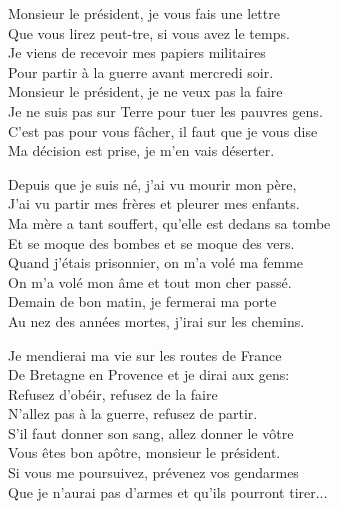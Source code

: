 
\ve{}
Monsieur le président, je vous fais une lettre\\
Que vous lirez peut-tre, si vous avez le temps.\\
Je viens de recevoir mes papiers militaires\\
Pour partir à la guerre avant mercredi soir.\\
Monsieur le président, je ne veux pas la faire\\
Je ne suis pas sur Terre pour tuer les pauvres gens.\\
C'est pas pour vous fâcher, il faut que je vous dise\\
Ma décision est prise, je m'en vais déserter.

\ve{}
Depuis que je suis né, j’ai vu mourir mon père,\\
J’ai vu partir mes frères et pleurer mes enfants.\\
Ma mère a tant souffert, qu’elle est dedans sa tombe\\
Et se moque des bombes et se moque des vers.\\
Quand j’étais prisonnier, on m’a volé ma femme\\
On m’a volé mon âme et tout mon cher passé.\\
Demain de bon matin, je fermerai ma porte\\
Au nez des années mortes, j’irai sur les chemins.

\ve{}
Je mendierai ma vie sur les routes de France\\
De Bretagne en Provence et je dirai aux gens:\\
Refusez d’obéir, refusez de la faire\\
N’allez pas à la guerre, refusez de partir.\\
S’il faut donner son sang, allez donner le vôtre\\
Vous êtes bon apôtre, monsieur le président.\\
Si vous me poursuivez, prévenez vos gendarmes\\
Que je n'aurai pas d’armes et qu’ils pourront tirer...

\esong